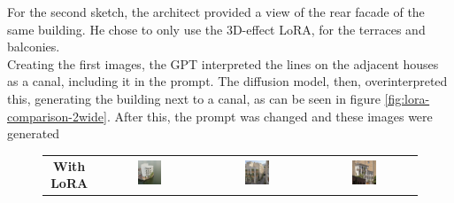 For the second sketch, the architect provided a view of the rear facade of the same building. He chose to only use the 3D-effect LoRA, for the terraces and balconies.\\
Creating the first images, the GPT interpreted the lines on the adjacent houses as a canal, including it in the prompt. The diffusion model, then, overinterpreted this, generating the building next to a canal, as can be seen in figure \ref{fig:lora-comparison-2wide}. After this, the prompt was changed and these images were generated 

\begin{figure}[H]
  \centering
  {\footnotesize
  \renewcommand{\arraystretch}{1.1}
  \setlength{\tabcolsep}{4pt}
  \begin{tabular}{c c c c}
    \textbf{With LoRA} &
    \includegraphics[width=0.25\textwidth]{Images/Results/Architect-A_unstructured-phase/generated_images/2/Met_lora_00008_.png} &
    \includegraphics[width=0.25\textwidth]{Images/Results/Architect-A_unstructured-phase/generated_images/2/Met_lora_00012_.png} &
    \includegraphics[width=0.25\textwidth]{Images/Results/Architect-A_unstructured-phase/generated_images/2/Met_lora_00013_.png} \\


\end{tabular}}
\end{figure}
